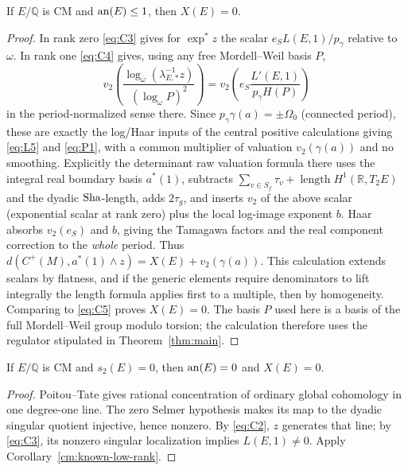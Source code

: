 \begin{corollary}
\label{cm:known-low-rank}
If \(E/\mathbb Q\) is CM and \(\operatorname{an}(E)\le1\), then \(X(E)=0\).
\end{corollary}

\begin{proof}
In rank zero \eqref{eq:C3} gives for \(\exp^*z\) the scalar \(e_S L(E,1)/p_\gamma\) relative
to \(\omega\). In rank one \eqref{eq:C4} gives, using any free Mordell--Weil basis \(P\),
\[
 v_2\left(\frac{\log_\omega(\lambda_{E,*}^{-1}z)}{(\log_\omega P)^2}\right)
   =v_2\left(e_S\frac{L'(E,1)}{p_\gamma H(P)}\right)
\]
in the period-normalized sense there. Since \(p_\gamma\gamma(a)=\pm\Omega_0\) (connected
period), these are exactly the log/Haar inputs of the central positive calculations giving
\eqref{eq:L5} and \eqref{eq:P1}, with a common multiplier of valuation \(v_2(\gamma(a))\) and
no smoothing. Explicitly the determinant raw valuation formula there uses the integral real
boundary basis \(a^*(1)\), subtracts \(\sum_{v\in S_f}\tau_v+\operatorname{length}H^1(\mathbb
R,T_2 E)\) and the dyadic \(\operatorname{Sha}\)-length, adds \(2\tau_g\), and inserts \(v_2\) of the above
scalar (exponential scalar at rank zero) plus the local log-image exponent \(b\). Haar absorbs
\(v_2(e_S)\) and \(b\), giving the Tamagawa factors and the real component correction to the
\emph{whole} period. Thus \(d(C^+(M),a^*(1)\wedge z)=X(E)+v_2(\gamma(a))\). This calculation
extends scalars by flatness, and if the generic elements require denominators to lift
integrally the length formula applies first to a multiple, then by homogeneity. Comparing to
\eqref{eq:C5} proves \(X(E)=0\). The basis \(P\) used here is a basis of the full
Mordell--Weil group modulo torsion; the calculation therefore uses
the regulator stipulated in Theorem~\ref{thm:main}.
\end{proof} 

\begin{corollary}\label{cm:corank-zero}
If \(E/\mathbb Q\) is CM and \(s_2(E)=0\), then
\(\operatorname{an}(E)=0\) and \(X(E)=0\).
\end{corollary}

\begin{proof}
Poitou--Tate gives rational concentration of ordinary global
cohomology in one degree-one line. The zero Selmer hypothesis makes
its map to the dyadic singular quotient injective, hence nonzero.
By \eqref{eq:C2}, \(z\) generates that line; by \eqref{eq:C3},
its nonzero singular localization implies \(L(E,1)\ne0\).
Apply Corollary~\ref{cm:known-low-rank}.
\end{proof}

